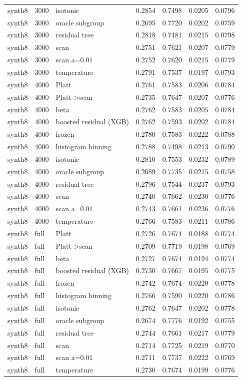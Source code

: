 \begin{tabular}{lllrrrr}
synth8 & 3000 & isotonic & 0.2854 & 0.7498 & 0.0205 & 0.0796 \\
synth8 & 3000 & oracle subgroup & 0.2695 & 0.7720 & 0.0202 & 0.0759 \\
synth8 & 3000 & residual tree & 0.2818 & 0.7481 & 0.0215 & 0.0798 \\
synth8 & 3000 & scan & 0.2751 & 0.7621 & 0.0207 & 0.0779 \\
synth8 & 3000 & scan a=0.01 & 0.2752 & 0.7620 & 0.0215 & 0.0779 \\
synth8 & 3000 & temperature & 0.2791 & 0.7537 & 0.0197 & 0.0793 \\
synth8 & 4000 & Platt & 0.2761 & 0.7583 & 0.0206 & 0.0784 \\
synth8 & 4000 & Platt->scan & 0.2735 & 0.7647 & 0.0207 & 0.0776 \\
synth8 & 4000 & beta & 0.2762 & 0.7583 & 0.0205 & 0.0784 \\
synth8 & 4000 & boosted residual (XGB) & 0.2762 & 0.7593 & 0.0202 & 0.0784 \\
synth8 & 4000 & frozen & 0.2780 & 0.7583 & 0.0222 & 0.0788 \\
synth8 & 4000 & histogram binning & 0.2788 & 0.7498 & 0.0213 & 0.0790 \\
synth8 & 4000 & isotonic & 0.2810 & 0.7553 & 0.0232 & 0.0789 \\
synth8 & 4000 & oracle subgroup & 0.2689 & 0.7735 & 0.0215 & 0.0758 \\
synth8 & 4000 & residual tree & 0.2796 & 0.7544 & 0.0237 & 0.0793 \\
synth8 & 4000 & scan & 0.2740 & 0.7662 & 0.0230 & 0.0776 \\
synth8 & 4000 & scan a=0.01 & 0.2743 & 0.7661 & 0.0236 & 0.0776 \\
synth8 & 4000 & temperature & 0.2766 & 0.7583 & 0.0211 & 0.0786 \\
synth8 & full & Platt & 0.2726 & 0.7674 & 0.0188 & 0.0774 \\
synth8 & full & Platt->scan & 0.2709 & 0.7719 & 0.0198 & 0.0769 \\
synth8 & full & beta & 0.2727 & 0.7674 & 0.0194 & 0.0774 \\
synth8 & full & boosted residual (XGB) & 0.2730 & 0.7667 & 0.0195 & 0.0775 \\
synth8 & full & frozen & 0.2742 & 0.7674 & 0.0220 & 0.0778 \\
synth8 & full & histogram binning & 0.2766 & 0.7590 & 0.0220 & 0.0786 \\
synth8 & full & isotonic & 0.2762 & 0.7647 & 0.0202 & 0.0778 \\
synth8 & full & oracle subgroup & 0.2674 & 0.7776 & 0.0192 & 0.0755 \\
synth8 & full & residual tree & 0.2744 & 0.7661 & 0.0217 & 0.0779 \\
synth8 & full & scan & 0.2714 & 0.7725 & 0.0219 & 0.0770 \\
synth8 & full & scan a=0.01 & 0.2711 & 0.7737 & 0.0222 & 0.0769 \\
synth8 & full & temperature & 0.2730 & 0.7674 & 0.0199 & 0.0776 \\
\bottomrule
\end{tabular}

